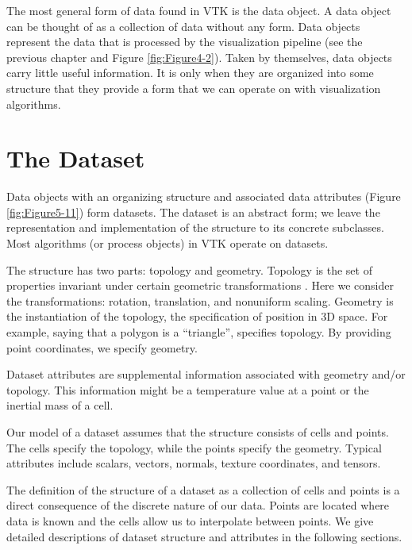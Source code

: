 The most general form of data found in VTK is the data object. A data object can be thought of as a collection of data without any form. Data objects represent the data that is processed by the visualization pipeline (see the previous chapter and Figure \ref{fig:Figure4-2}). Taken by themselves, data objects carry little useful information. It is only when they are organized into some structure that they provide a form that we can operate on with visualization algorithms.

\section{The Dataset}
\label{sec:dataset}

Data objects with an organizing structure and associated data attributes (Figure \ref{fig:Figure5-11}) form datasets. The dataset is an abstract form; we leave the representation and implementation of the structure to its concrete subclasses. Most algorithms (or process objects) in VTK operate on datasets.

The structure has two parts: topology and geometry. Topology is the set of properties invariant under certain geometric transformations \cite{Weiler86}. Here we consider the transformations: rotation, translation, and nonuniform scaling. Geometry is the instantiation of the topology, the specification of position in 3D space. For example, saying that a polygon is a ``triangle'', specifies topology. By providing point coordinates, we specify geometry.

Dataset attributes are supplemental information associated with geometry and/or topology. This information might be a temperature value at a point or the inertial mass of a cell.

Our model of a dataset assumes that the structure consists of cells and points. The cells specify the topology, while the points specify the geometry. Typical attributes include scalars, vectors, normals, texture coordinates, and tensors.

The definition of the structure of a dataset as a collection of cells and points is a direct consequence of the discrete nature of our data. Points are located where data is known and the cells allow us to interpolate between points. We give detailed descriptions of dataset structure and attributes in the following sections.

